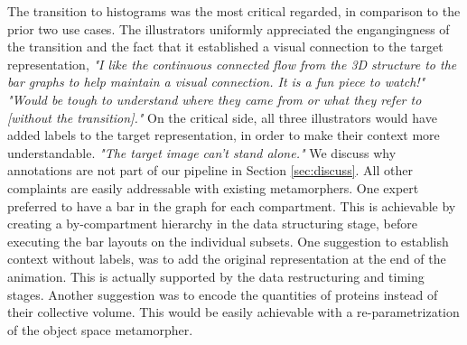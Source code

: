 





The transition to histograms was the most critical regarded, in comparison to the prior two use cases.
The illustrators uniformly appreciated the engangingness of the transition and the fact that it established a visual connection to the target representation, \textit{"I like the continuous connected flow from the 3D structure to the bar graphs to help maintain a visual connection. It is a fun piece to watch!" "Would be tough to understand where they came from or what they refer to [without the transition]."}
On the critical side, all three illustrators would have added labels to the target representation, in order to make their context more understandable. \textit{"The target image can't stand alone."}
We discuss why annotations are not part of our pipeline in Section \ref{sec:discuss}.
All other complaints are easily addressable with existing metamorphers. One expert preferred to have a bar in the graph for each compartment. This is achievable by creating a by-compartment hierarchy in the data structuring stage, before executing the bar layouts on the individual subsets. One suggestion to establish context without labels, was to add the original representation at the end of the animation. This is actually supported by the data restructuring and timing stages. Another suggestion was to encode the quantities of proteins instead of their collective volume. This would be easily achievable with a re-parametrization of the object space metamorpher.


